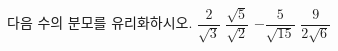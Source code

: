 다음 수의 분모를 유리화하시오.
 $\dfrac{2}{\sqrt{3}}$
 $\dfrac{\sqrt{5}}{\sqrt{2}}$
 $-\dfrac{5}{\sqrt{15}}$
 $\dfrac{9}{2\sqrt{6}}$
